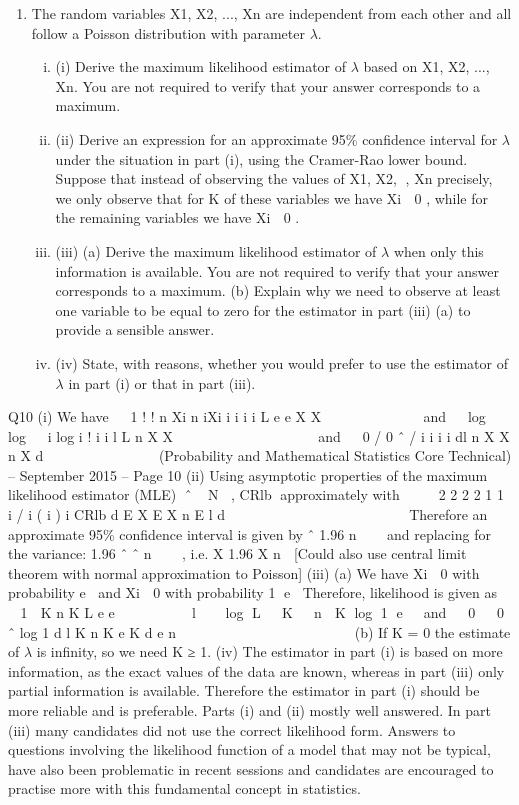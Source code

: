 \documentclass[a4paper,12pt]{article}
\begin{document}
\begin{enumerate}
\item The random variables X1, X2, ..., Xn are independent from each other and all follow a
Poisson distribution with parameter $\lambda$.
\begin{enumerate}[(i)]
\item (i) Derive the maximum likelihood estimator of $\lambda$ based on X1, X2, ..., Xn. You
are not required to verify that your answer corresponds to a maximum. 
\item (ii) Derive an expression for an approximate 95\% confidence interval for $\lambda$ under
the situation in part (i), using the Cramer-Rao lower bound. 
Suppose that instead of observing the values of X1, X2, , Xn precisely, we only
observe that for K of these variables we have Xi  0 , while for the remaining
variables we have Xi  0 .
\item (iii) (a) Derive the maximum likelihood estimator of $\lambda$ when only this
information is available. You are not required to verify that your
answer corresponds to a maximum. 
(b) Explain why we need to observe at least one variable to be equal to
zero for the estimator in part (iii) (a) to provide a sensible answer. 
\item (iv) State, with reasons, whether you would prefer to use the estimator of $\lambda$ in part
(i) or that in part (iii). 
\end{enumerate}
\end{enumerate}

  Q10 (i) We have
 
1
! !
  n Xi n iXi
i i i i
L e e
X X
  

 
    and
  log   log   i log i !
  i i
l L n X X
 
        
 
 
and   0 / 0 ˆ / i i
i i
dl n X X n X
d
        
  
 (Probability and Mathematical Statistics Core Technical) – September 2015 – %
Page 10
(ii) Using asymptotic properties of the maximum likelihood estimator (MLE)
ˆ ~ N , CRlb approximately
with
   
2
2 2
2
1 1
i / i ( i ) i
CRlb
d E X E X n E l
d
 
     
         
 
Therefore an approximate 95\% confidence interval is given by ˆ 1.96
n

 
and replacing for the variance: 1.96
ˆ ˆ
n

  , i.e. X 1.96 X
n

[Could also use central limit theorem with normal approximation to Poisson]
(iii) (a) We have Xi  0 with probability e and Xi  0 with probability
1 e
Therefore, likelihood is given as
  1 
K n K L e e

      
l   log L  K  n  K log 1 e 
and
  0   0 ˆ log
1
d l K n K e K
d e n


               
(b) If K = 0 the estimate of $\lambda$ is infinity, so we need K ≥ 1.
(iv) The estimator in part (i) is based on more information, as the exact values of
the data are known, whereas in part (iii) only partial information is available.
Therefore the estimator in part (i) should be more reliable and is preferable.
Parts (i) and (ii) mostly well answered. In part (iii) many candidates did not
use the correct likelihood form. Answers to questions involving the likelihood
function of a model that may not be typical, have also been problematic in
recent sessions and candidates are encouraged to practise more with this
fundamental concept in statistics.
\end{document}

